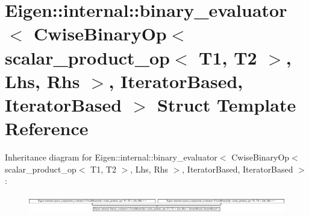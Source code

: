 \hypertarget{struct_eigen_1_1internal_1_1binary__evaluator_3_01_cwise_binary_op_3_01scalar__product__op_3_01_c08fe00fb24daf817c472c5c54760eed}{}\section{Eigen\+:\+:internal\+:\+:binary\+\_\+evaluator$<$ Cwise\+Binary\+Op$<$ scalar\+\_\+product\+\_\+op$<$ T1, T2 $>$, Lhs, Rhs $>$, Iterator\+Based, Iterator\+Based $>$ Struct Template Reference}
\label{struct_eigen_1_1internal_1_1binary__evaluator_3_01_cwise_binary_op_3_01scalar__product__op_3_01_c08fe00fb24daf817c472c5c54760eed}
Inheritance diagram for Eigen\+:\+:internal\+:\+:binary\+\_\+evaluator$<$ Cwise\+Binary\+Op$<$ scalar\+\_\+product\+\_\+op$<$ T1, T2 $>$, Lhs, Rhs $>$, Iterator\+Based, Iterator\+Based $>$\+:\begin{figure}[H]
\begin{center}
\leavevmode
\includegraphics[height=0.765027cm]{struct_eigen_1_1internal_1_1binary__evaluator_3_01_cwise_binary_op_3_01scalar__product__op_3_01_c08fe00fb24daf817c472c5c54760eed}
\end{center}
\end{figure}
